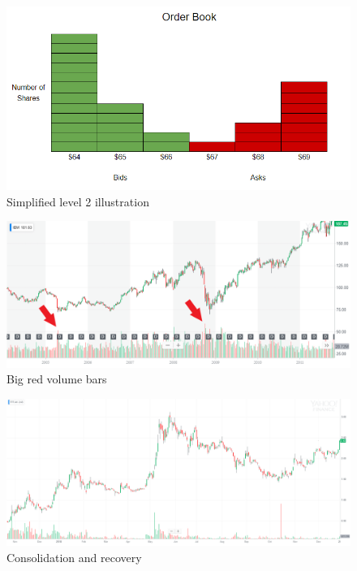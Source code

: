 \documentclass{article}
\begin{document}
\vspace{10pt}

\begin{figure}[!htb]
    \centering
    \includegraphics[width=\textwidth]{imgs/9.png}
    \caption{Simplified level 2 illustration}
\end{figure}

\vspace{10pt}

\begin{figure}[!htb]
    \centering
    \includegraphics[width=\textwidth]{imgs/10.png}
    \caption{Big red volume bars}
\end{figure}

\vspace{10pt}

\begin{figure}[!htb]
    \centering
    \includegraphics[width=\textwidth]{imgs/11.png}
    \caption{Consolidation and recovery}
\end{figure}
\end{document}
